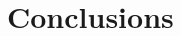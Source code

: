 \documentclass[preprint,12pt]{elsarticle}
\begin{document}

\section{Conclusions}






\clearpage

 



\begin{thebibliography}{00}



\end{thebibliography}
\end{document}

